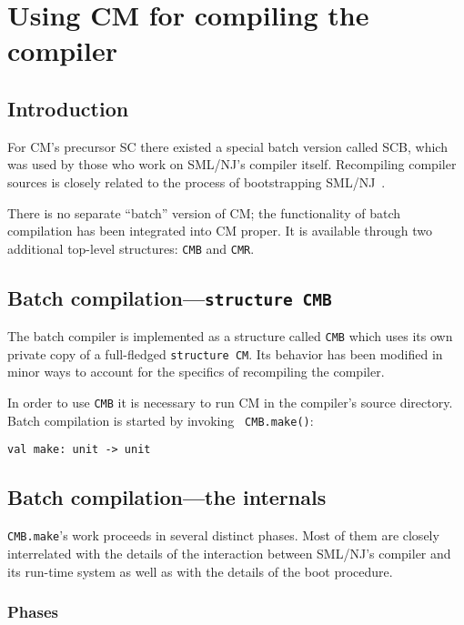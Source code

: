 \documentclass{article}
\begin{document}
\section{Using CM for compiling the compiler}

\subsection{Introduction}

For CM's precursor SC there existed a special batch version called
SCB, which was used by those who work on SML/NJ's compiler itself.
Recompiling compiler sources is closely related to the process of
bootstrapping SML/NJ~\cite{appel94:bootstrap}.

There is no separate ``batch'' version of CM; the functionality of
batch compilation has been integrated into CM proper.  It is available
through two additional top-level structures: {\tt CMB} and {\tt CMR}.

\subsection{Batch compilation---{\tt structure CMB}}

The batch compiler is implemented as a structure called {\tt CMB}
which uses its own private copy of a full-fledged {\tt structure CM}.
Its behavior has been modified in minor ways to account for the
specifics of recompiling the compiler.

In order to use {\tt CMB} it is necessary to run CM in the compiler's
source directory.  Batch compilation is started by invoking {\tt
CMB.make()}:
\begin{verbatim}
val make: unit -> unit
\end{verbatim}

\subsection{Batch compilation---the internals}

{\tt CMB.make}'s work proceeds in several distinct phases.  Most of
them are closely interrelated with the details of the interaction
between SML/NJ's compiler and its run-time system as well as with the
details of the boot procedure.

\subsubsection{Phases}
\end{document}
